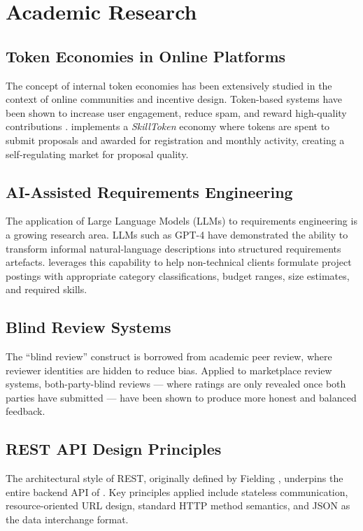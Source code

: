\section{Academic Research}

\subsection{Token Economies in Online Platforms}

The concept of internal token economies has been extensively studied in the context of online communities and incentive design. Token-based systems have been shown to increase user engagement, reduce spam, and reward high-quality contributions \cite{designPatterns}. \projectname{} implements a \textit{SkillToken} economy where tokens are spent to submit proposals and awarded for registration and monthly activity, creating a self-regulating market for proposal quality.

\subsection{AI-Assisted Requirements Engineering}

The application of Large Language Models (LLMs) to requirements engineering is a growing research area. LLMs such as GPT-4 \cite{openai2024} have demonstrated the ability to transform informal natural-language descriptions into structured requirements artefacts. \projectname{} leverages this capability to help non-technical clients formulate project postings with appropriate category classifications, budget ranges, size estimates, and required skills.

\subsection{Blind Review Systems}

The ``blind review'' construct is borrowed from academic peer review, where reviewer identities are hidden to reduce bias. Applied to marketplace review systems, both-party-blind reviews --- where ratings are only revealed once both parties have submitted --- have been shown to produce more honest and balanced feedback.

\subsection{REST API Design Principles}

The architectural style of REST, originally defined by Fielding \cite{restApi}, underpins the entire backend API of \projectname{}. Key principles applied include stateless communication, resource-oriented URL design, standard HTTP method semantics, and JSON as the data interchange format.

